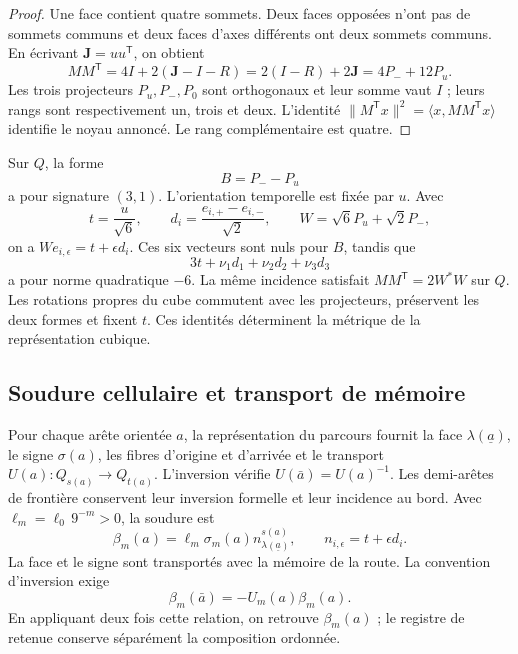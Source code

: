 \begin{proof}
Une face contient quatre sommets. Deux faces opposées n'ont pas de sommets
communs et deux faces d'axes différents ont deux sommets communs.
En écrivant \(\mathbf J=uu^{\mathsf T}\), on obtient
\[
 MM^{\mathsf T}=4I+2(\mathbf J-I-R)
 =2(I-R)+2\mathbf J=4P_-+12P_u.
\]
Les trois projecteurs \(P_u,P_-,P_0\) sont orthogonaux et leur somme vaut \(I\) ; leurs rangs sont respectivement un, trois et deux. L'identité \(\|M^{\mathsf T}x\|^2=\langle x,MM^{\mathsf T}x\rangle\) identifie le noyau annoncé. Le rang complémentaire est quatre.
\end{proof}

Sur \(Q\), la forme
\[
 B=P_--P_u
\]
a pour signature \((3,1)\). L'orientation temporelle est fixée par \(u\).
Avec
\[
 t=\frac{u}{\sqrt6},\qquad
 d_i=\frac{e_{i,+}-e_{i,-}}{\sqrt2},\qquad
 W=\sqrt6P_u+\sqrt2P_-,
\]
on a \(We_{i,\epsilon}=t+\epsilon d_i\). Ces six vecteurs
sont nuls pour \(B\), tandis que
\[
 3t+\nu_1d_1+\nu_2d_2+\nu_3d_3
\]
a pour norme quadratique \(-6\). La même incidence satisfait
\(MM^{\mathsf T}=2W^*W\) sur \(Q\). Les rotations propres du cube
commutent avec les projecteurs, préservent les deux formes et fixent \(t\).
Ces identités déterminent la métrique de la représentation cubique.

\subsection{Soudure cellulaire et transport de mémoire}
\label{vii:sec:soldadura-celular}

Pour chaque arête orientée \(a\), la représentation du parcours fournit la face \(\lambda(\underline a)\), le signe \(\sigma(a)\), les fibres d'origine et d'arrivée et le transport \(U(a):Q_{s(a)}\longrightarrow Q_{t(a)}\). L'inversion vérifie \(U(\bar a)=U(a)^{-1}\). Les demi-arêtes de frontière conservent leur inversion formelle et leur incidence au bord. Avec \(\ell_m=\ell_0\,9^{-m}>0\), la soudure est
\begin{equation}
 \beta_m(a)=\ell_m\sigma_m(a)
              n_{\lambda(\underline a)}^{s(a)},\qquad
 n_{i,\epsilon}=t+\epsilon d_i.
 \label{vii:eq:soldadura-arista}
\end{equation}
La face et le signe sont transportés avec la mémoire de la route. La convention d'inversion exige
\begin{equation}
 \beta_m(\bar a)=-U_m(a)\beta_m(a).
 \label{vii:eq:inversion-soldadura}
\end{equation}
En appliquant deux fois cette relation, on retrouve \(\beta_m(a)\) ; le registre de retenue conserve séparément la composition ordonnée.

